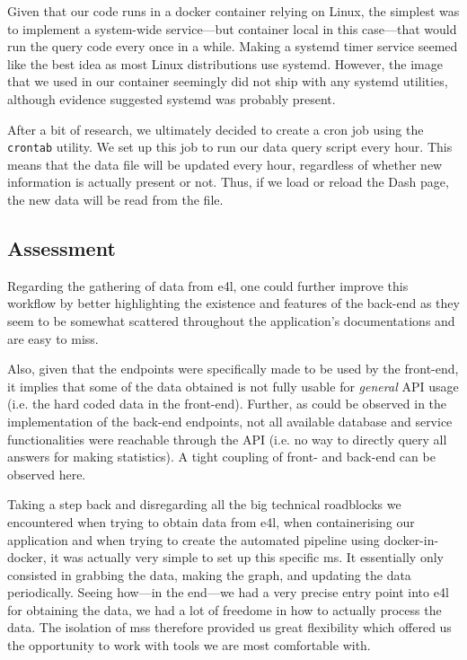 Given that our code runs in a docker container relying on Linux, the
simplest was to implement a system-wide service---but container local
in this case---that would run the query code every once in a while.
Making a systemd timer service seemed like the best idea as most Linux
distributions use systemd. However, the image that we used in our
container seemingly did not ship with any systemd utilities, although
evidence suggested systemd was probably present.

After a bit of research, we ultimately decided to create a cron job
using the \verb|crontab| utility. We set up this job to run our data
query script every hour. This means that the data file will be updated
every hour, regardless of whether new information is actually present
or not. Thus, if we load or reload the Dash page, the new data will be
read from the file.

\subsection{Assessment}

Regarding the gathering of data from \gls{e4l}, one could further
improve this workflow by better highlighting the existence and
features of the back-end as they seem to be somewhat scattered
throughout the application's documentations and are easy to miss.

Also, given that the endpoints were specifically made to be used by
the front-end, it implies that some of the data obtained is not fully
usable for \textit{general} API usage (i.e. the hard coded data in the
front-end). Further, as could be observed in the implementation of the
back-end endpoints, not all available database and service
functionalities were reachable through the API (i.e. no way to
directly query all answers for making statistics). A tight coupling of
front- and back-end can be observed here.

Taking a step back and disregarding all the big technical roadblocks
we encountered when trying to obtain data from \gls{e4l}, when
containerising our application and when trying to create the automated
pipeline using docker-in-docker, it was actually very simple to set up
this specific \gls{ms}. It essentially only consisted in grabbing the
data, making the graph, and updating the data periodically. Seeing
how---in the end---we had a very precise entry point into \gls{e4l}
for obtaining the data, we had a lot of freedome in how to actually
process the data. The isolation of \glspl{ms} therefore provided us
great flexibility which offered us the opportunity to work with tools
we are most comfortable with.

